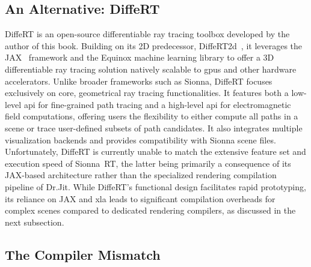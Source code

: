 \subsection{An Alternative: DiffeRT}

DiffeRT is an open-source differentiable ray tracing toolbox developed by the author of this book. Building on its 2D predecessor, DiffeRT2d~, it leverages the JAX~ framework and the Equinox machine learning library to offer a 3D differentiable ray tracing solution natively scalable to \glspl{gpu} and other hardware accelerators. Unlike broader frameworks such as Sionna, DiffeRT focuses exclusively on core, geometrical ray tracing functionalities. It features both a low-level \gls{api} for fine-grained path tracing and a high-level \gls{api} for electromagnetic field computations, offering users the flexibility to either compute all paths in a scene or trace user-defined subsets of path candidates. It also integrates multiple visualization backends and provides compatibility with Sionna scene files. Unfortunately, DiffeRT is currently unable to match the extensive feature set and execution speed of Sionna~RT, the latter being primarily a consequence of its JAX-based architecture rather than the specialized rendering compilation pipeline of Dr.Jit. While DiffeRT's functional design facilitates rapid prototyping, its reliance on JAX and \gls{xla} leads to significant compilation overheads for complex scenes compared to dedicated rendering compilers, as discussed in the next subsection.

\subsection{The  Compiler Mismatch}

